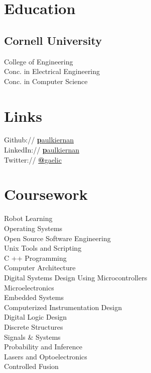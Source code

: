 \documentclass[]{deedy-resume-openfont}
\begin{document}
\lastupdated
{}

\begin{minipage}[t]{0.33\textwidth}

    \section{Education}
        \subsection{Cornell University}
            College of Engineering \\
            Conc. in Electrical Engineering \\
            Conc. in Computer Science\\
    \sectionsep

    \section{Links}
        Github:// \href{https://github.com/paulkiernan}{\textbf paulkiernan} \\
        LinkedIn:// \href{https://www.linkedin.com/pub/paul-kiernan/24/a32/470}{\textbf paulkiernan} \\
        Twitter:// \href{https://twitter.com/gaelic}{\textbf @gaelic} \\
    \sectionsep

    \section{Coursework}
        Robot Learning\\
        Operating Systems \\
        Open Source Software Engineering \\
        Unix Tools and Scripting \\
        C ++ Programming\\
        Computer Architecture\\
        Digital Systems Design Using Microcontrollers\\
        Microelectronics\\
        Embedded Systems\\
        Computerized Instrumentation Design\\
        Digital Logic Design\\
        Discrete Structures\\
        Signals \& Systems\\
        Probability and Inference\\
        Lasers and Optoelectronics\\
        Controlled Fusion\\
    \sectionsep


\end{minipage}
\end{document}
